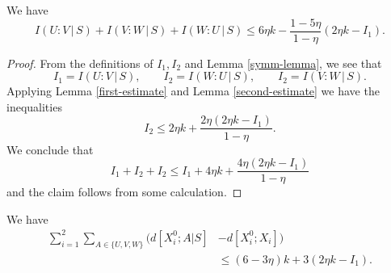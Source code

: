 \begin{lemma}\label{uvw-s}
\leanok
We have
$$
I(U : V \, | \, S) + I(V : W \, | \,S) + I(W : U \, | \, S) \leq 6 \eta k - \frac{1 - 5 \eta}{1-\eta} (2 \eta k - I_1).
$$
\end{lemma}

\begin{proof}
  \leanok
From the definitions of $I_1,I_2$ and Lemma \ref{symm-lemma}, we see that
\[
  I_1 = I(U : V \, | \, S), \qquad I_2 = I(W : U \, | \, S), \qquad I_2 = I(V : W \, | \,S).
\]
Applying Lemma \ref{first-estimate} and Lemma \ref{second-estimate} we have the inequalities
\[  I_2 \leq 2 \eta k + \frac{2\eta(2 \eta k - I_1)}{1-\eta} .
\]
We conclude that
$$
   I_1 + I_2 + I_2 \leq I_1+4\eta k+ \frac{4\eta(2 \eta k - I_1)}{1-\eta}
$$
and the claim follows from some calculation.
\end{proof}

\begin{lemma}\label{total-dist}\leanok
   We have
\begin{align*}
  \sum_{i=1}^2 \sum_{A\in\{U,V,W\}} \big(d[X^0_i;A|S] & - d[X^0_i;X_i]\big) \\
    &\leq (6 - 3\eta) k + 3(2 \eta k - I_1).
\end{align*}
\end{lemma}


